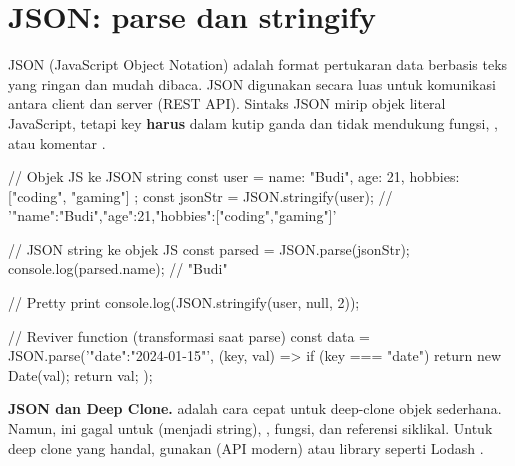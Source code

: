 \section{JSON: parse dan stringify}

JSON (JavaScript Object Notation) adalah format pertukaran data berbasis teks yang ringan dan mudah dibaca. JSON digunakan secara luas untuk komunikasi antara client dan server (REST API). Sintaks JSON mirip objek literal JavaScript, tetapi key \textbf{harus} dalam kutip ganda dan tidak mendukung fungsi, , atau komentar \cite{jsInfo}.

\begin{webcode}[language=JavaScript, caption={JSON parse dan stringify}]
// Objek JS ke JSON string
const user = { name: "Budi", age: 21, hobbies: ["coding", "gaming"] };
const jsonStr = JSON.stringify(user);
// '{"name":"Budi","age":21,"hobbies":["coding","gaming"]}'

// JSON string ke objek JS
const parsed = JSON.parse(jsonStr);
console.log(parsed.name); // "Budi"

// Pretty print
console.log(JSON.stringify(user, null, 2));

// Reviver function (transformasi saat parse)
const data = JSON.parse('{"date":"2024-01-15"}', (key, val) => {
  if (key === "date") return new Date(val);
  return val;
});
\end{webcode}

\begin{konsep}
\textbf{JSON dan Deep Clone.}  adalah cara cepat untuk deep-clone objek sederhana. Namun, ini gagal untuk  (menjadi string), , fungsi, dan referensi siklikal. Untuk deep clone yang handal, gunakan  (API modern) atau library seperti Lodash  \cite{mdnJsGuide}.
\end{konsep}

